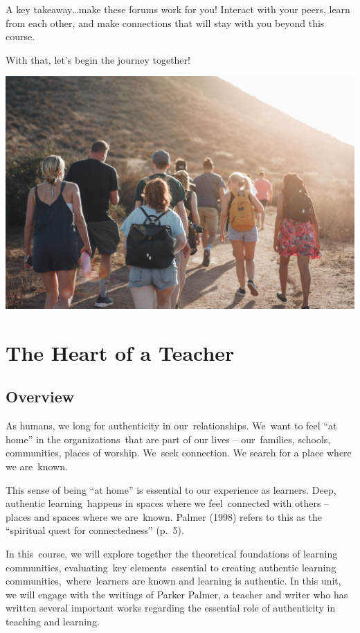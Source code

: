 \documentclass[
]{book}
\begin{document}
A key takeaway\ldots make these forums work for you! Interact with your peers, learn from each other, and make connections that will stay with you beyond this course.

With that, let's begin the journey together!

\includegraphics{assets/community/luke-porter-NEqEC7qa9FM-unsplash.jpg}

\hypertarget{the-heart-of-a-teacher}{%
\chapter{The Heart of a Teacher}\label{the-heart-of-a-teacher}}

\hypertarget{overview}{%
\section*{Overview}\label{overview}}

As humans, we long for authenticity in our~relationships. We~want to feel ``at home'' in the organizations~that are part of our lives -- our~families, schools, communities, places of worship. We~seek connection. We search for a place where we are~known.

This sense of being ``at home'' is essential to our experience as learners. Deep, authentic learning~happens in spaces where we feel~connected with others -- places and spaces where we are~known. Palmer (1998) refers to this as the ``spiritual quest for connectedness'' (p.~5).

In this~course, we will explore together the theoretical foundations of learning communities, evaluating~key elements~essential to creating authentic learning communities,~where~learners are known and learning is authentic. In this unit, we will engage with the writings of Parker Palmer, a teacher and writer who has written several important works regarding the essential role of authenticity in teaching and learning.
\end{document}
